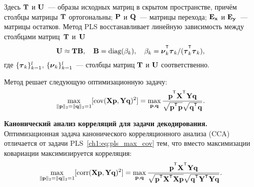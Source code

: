 \documentclass[11pt, a5paper]{dissert}
\begin{document}
Здесь $\mathbf{T}$ и $\mathbf{U}$~--- образы исходных матриц в скрытом пространстве, причём столбцы матрицы $\mathbf{T}$ ортогональны; $\mathbf{P}$ и $\mathbf{Q}$~--- матрицы перехода; $\mathbf{E}_{\mathbf{x}}$ и $\mathbf{E}_{\mathbf{y}}$~--- матрицы остатков. 
Метод PLS восстанавливает линейную зависимость между столбцами матриц~$\mathbf{T}$ и~$\mathbf{U}$
\begin{equation*}
	\bU \approx \bT \bB, \quad \bB = \text{diag}(\beta_k), \quad \beta_k = \bnu_k^{\T}\btau_k / (\btau_k^{\T}\btau_k),
\end{equation*}
где $\{\boldsymbol{\tau}_k\}_{k=1}^l$, $\{\boldsymbol{\nu}_k\}_{k=1}^l$~--- столбцы матриц $\mathbf{T}$ и $\mathbf{U}$ соответственно.

Метод решает следующую оптимизационную задачу:
\begin{equation}
	\max_{\|\bp\|_{2}=\|\bq\|_{2}=1}[ \text{cov}(\bX \bp, \bY \bq)^{2}] = \max_{\bp, \bq} \frac{\bp^{\T} \bX^{\T} \bY \bq}{\sqrt{\bp^{\T} \bp} \sqrt{\bq^{\T} \bq}}.
	\label{ch1:eq:pls_max_cov}
\end{equation}

\vspace{0.5cm}
\textbf{Канонический анализ корреляций для задачи декодирования.}
Оптимизационная задача канонического корреляционного анализа (CCA) отличается от задачи PLS~\eqref{ch1:eq:pls_max_cov} тем, что вместо максимизации ковариации максимизируется корреляция:
\begin{equation}
	\max_{\|\bp\|_{2}=\|\bq\|_{2}=1}[ \text{corr}(\bX \bp, \bY \bq)^{2}] = \max_{\bp, \bq} \frac{\bp^{\T} \bX^{\T} \bY \bq}{\sqrt{\bp^{\T} \bX^{\T}  \bX \bp} \sqrt{\bq^{\T} \bY^{\T}  \bY\bq}}.
	\label{ch1:eq:cca_max_corr}
\end{equation}
\end{document}
